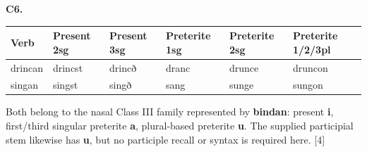 \par\begin{minipage}{\linewidth}\raggedright
\textbf{C6.}

\par\begingroup
\fontsize{10.5}{13.2}\selectfont
\setlength{\LTleft}{0pt}\setlength{\LTright}{\fill}
\noindent
\begin{tabular}{@{}>{\raggedright\arraybackslash}p{17.12mm}>{\raggedright\arraybackslash}p{17.12mm}>{\raggedright\arraybackslash}p{17.12mm}>{\raggedright\arraybackslash}p{18.49mm}>{\raggedright\arraybackslash}p{18.49mm}>{\raggedright\arraybackslash}p{21.58mm}@{}}
\toprule
\textbf{Verb} & \textbf{Present 2sg} & \textbf{Present 3sg} & \textbf{Preterite 1sg} & \textbf{Preterite 2sg} & \textbf{Preterite 1/\allowbreak{}2/\allowbreak{}3pl} \\
\midrule
drincan & drincst & drincð & dranc & drunce & druncon \\
singan & singst & singð & sang & sunge & sungon \\
\bottomrule
\end{tabular}
\par\endgroup

Both belong to the nasal Class III family represented by \textbf{bindan}: present \textbf{i}, first/\allowbreak{}third singular preterite \textbf{a}, plural-based preterite \textbf{u}. The supplied participial stem likewise has \textbf{u}, but no participle recall or syntax is required here. [4]

\end{minipage}\par\addvspace{4pt}

